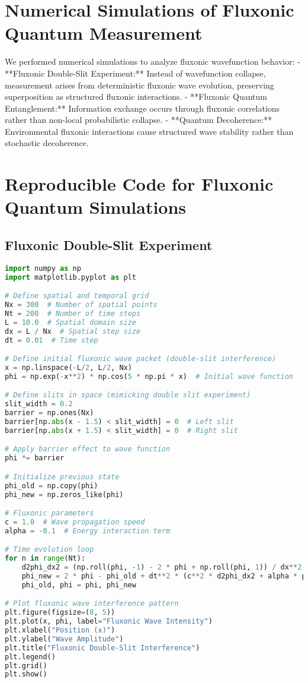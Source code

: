 \documentclass{article}
\begin{document}
\section{Numerical Simulations of Fluxonic Quantum Measurement}
We performed numerical simulations to analyze fluxonic wavefunction behavior:
- **Fluxonic Double-Slit Experiment:** Instead of wavefunction collapse, measurement arises from deterministic fluxonic wave evolution, preserving superposition as structured fluxonic interactions.
- **Fluxonic Quantum Entanglement:** Information exchange occurs through fluxonic correlations rather than non-local probabilistic collapse.
- **Quantum Decoherence:** Environmental fluxonic interactions cause structured wave stability rather than stochastic decoherence.

\section{Reproducible Code for Fluxonic Quantum Simulations}
\subsection{Fluxonic Double-Slit Experiment}
\begin{lstlisting}[language=Python]
import numpy as np
import matplotlib.pyplot as plt

# Define spatial and temporal grid
Nx = 300  # Number of spatial points
Nt = 200  # Number of time steps
L = 10.0  # Spatial domain size
dx = L / Nx  # Spatial step size
dt = 0.01  # Time step

# Define initial fluxonic wave packet (double-slit interference)
x = np.linspace(-L/2, L/2, Nx)
phi = np.exp(-x**2) * np.cos(5 * np.pi * x)  # Initial wave function

# Define slits in space (mimicking double slit experiment)
slit_width = 0.2
barrier = np.ones(Nx)
barrier[np.abs(x - 1.5) < slit_width] = 0  # Left slit
barrier[np.abs(x + 1.5) < slit_width] = 0  # Right slit

# Apply barrier effect to wave function
phi *= barrier

# Initialize previous state
phi_old = np.copy(phi)
phi_new = np.zeros_like(phi)

# Fluxonic parameters
c = 1.0  # Wave propagation speed
alpha = -0.1  # Energy interaction term

# Time evolution loop
for n in range(Nt):
    d2phi_dx2 = (np.roll(phi, -1) - 2 * phi + np.roll(phi, 1)) / dx**2
    phi_new = 2 * phi - phi_old + dt**2 * (c**2 * d2phi_dx2 + alpha * phi)
    phi_old, phi = phi, phi_new

# Plot fluxonic wave interference pattern
plt.figure(figsize=(8, 5))
plt.plot(x, phi, label="Fluxonic Wave Intensity")
plt.xlabel("Position (x)")
plt.ylabel("Wave Amplitude")
plt.title("Fluxonic Double-Slit Interference")
plt.legend()
plt.grid()
plt.show()
\end{lstlisting}
\end{document}
